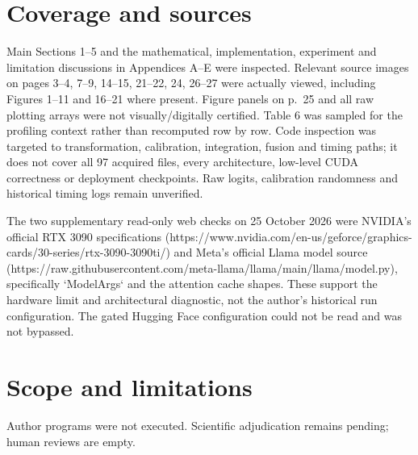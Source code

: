 \documentclass[10pt]{article}
\begin{document}
\section*{Coverage and sources}
Main Sections 1–5 and the mathematical, implementation, experiment and limitation discussions in Appendices A–E were inspected. Relevant source images on pages 3–4, 7–9, 14–15, 21–22, 24, 26–27 were actually viewed, including Figures 1–11 and 16–21 where present. Figure panels on p. 25 and all raw plotting arrays were not visually/digitally certified. Table 6 was sampled for the profiling context rather than recomputed row by row. Code inspection was targeted to transformation, calibration, integration, fusion and timing paths; it does not cover all 97 acquired files, every architecture, low-level CUDA correctness or deployment checkpoints. Raw logits, calibration randomness and historical timing logs remain unverified.\par
The two supplementary read-only web checks on 25 October 2026 were NVIDIA’s official RTX 3090 specifications (https://www.nvidia.com/en-us/geforce/graphics-cards/30-series/rtx-3090-3090ti/) and Meta’s official Llama model source (https://raw.githubusercontent.com/meta-llama/llama/main/llama/model.py), specifically `ModelArgs` and the attention cache shapes. These support the hardware limit and architectural diagnostic, not the author’s historical run configuration. The gated Hugging Face configuration could not be read and was not bypassed.\par
\section*{Scope and limitations}
Author programs were not executed. Scientific adjudication remains pending; human reviews are empty.\par
\end{document}

